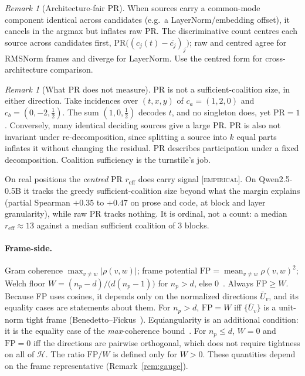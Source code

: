\documentclass[11pt]{article}
\theoremstyle{definition}
\theoremstyle{plain}
\theoremstyle{remark}
\newtheorem{remark}[theorem]{Remark}
\newcommand{\empirical}{\textsc{[empirical]}}
\newcommand{\HH}{\mathcal{H}}
\begin{document}
\begin{remark}[Architecture-fair PR]
When sources carry a common-mode component identical across candidates (e.g.\ a LayerNorm/embedding
offset), it cancels in the argmax but inflates raw $\mathrm{PR}$. The discriminative count centres each
source across candidates first, $\mathrm{PR}\bigl((c_j(t)-\overline{c_j})_j\bigr)$; raw and centred agree
for RMSNorm frames and diverge for LayerNorm. Use the centred form for cross-architecture comparison.
\end{remark}

\begin{remark}[What PR does not measure]\label{rem:pr}
PR is not a sufficient-coalition size, in either direction. Take incidences over $(t,x,y)$ of
$c_a=(1,2,0)$ and $c_b=(0,-2,\tfrac12)$. The sum $(1,0,\tfrac12)$ decodes $t$, and no singleton does,
yet $\mathrm{PR}=1$. Conversely, many identical deciding sources give a large PR. PR is also not invariant
under re-decomposition, since splitting a source into $k$ equal parts inflates it without changing the
residual. PR describes participation under a fixed decomposition. Coalition sufficiency is the turnstile's
job.

On real positions the \emph{centred} PR $r_{\mathrm{eff}}$ does carry signal \empirical{}. On Qwen2.5-0.5B it tracks
the greedy sufficient-coalition size beyond what the margin explains (partial Spearman $+0.35$ to $+0.47$ on prose
and code, at block and layer granularity), while raw PR tracks nothing. It is ordinal, not a count: a median
$r_{\mathrm{eff}}\approx13$ against a median sufficient coalition of 3 blocks.
\end{remark}

\paragraph{Frame-side.}
Gram coherence $\max_{v\neq w}|\rho(v,w)|$;\quad
frame potential $\mathrm{FP}=\operatorname{mean}_{v\neq w}\rho(v,w)^2$;\quad
Welch floor $W=(n_p-d)/\bigl(d(n_p-1)\bigr)$ for $n_p>d$, else $0$~\cite{welch1974lower}. Always $\mathrm{FP}\ge W$. Because FP
uses cosines, it depends only on the normalized directions $\bar U_v$, and its equality cases are
statements about them. For $n_p>d$, $\mathrm{FP}=W$ iff $\{\bar U_v\}$ is a unit-norm tight frame
(Benedetto--Fickus~\cite{benedetto2003finite}). Equiangularity is an additional condition: it is the
equality case of the \emph{max}-coherence bound~\cite{strohmer2003grassmannian}. For $n_p\le d$, $W=0$ and $\mathrm{FP}=0$ iff the directions are pairwise
orthogonal, which does not require tightness on all of $\HH$. The ratio $\mathrm{FP}/W$ is defined only
for $W>0$. These quantities depend on the
frame representative (Remark~\ref{rem:gauge}).
\end{document}
